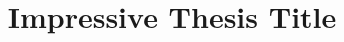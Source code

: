 \documentclass[
  doctype=phd,      %
  school=unl/fct,   %
	lang=en,          %
  fontstyle=kpfonts, %
  chapstyle=elegant, %
  coverlang=pt,     %
  otherlistsat=front, %
  aftercover=false, %
	linkscolor=darkblue,  %
	spine=true,			%
	biblatex={        %
		style=numeric,  %
		sorting=nyt,		%
		firstinits=true, %
		sortcites=true, %
	},
	memoir={a4paper, twoside, 11pt, draft},	%
  media=screen,      %
]{unlthesis}
\title{Impressive Thesis Title}
\begin{document}
\thesisfrontmatter	%
\printcoverpage		%
\printaftercover
\printcopyright		%
\printdedicatory	%
\printacknowledgements	%
\printquote		%
\printabstract		%
\tableofcontents* 	%
\printotherlists 	%


\thesismainmatter	%
\printchapthers		%
\printbib		%
\printotherlists 	%
\printappendixes	%

\end{document}
